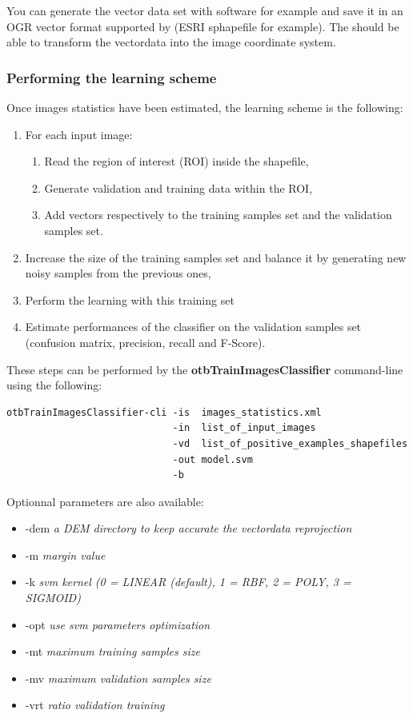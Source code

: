 You can generate the vector data set with \qgis software for
example and save it in an OGR vector format supported by \gdal (ESRI
sphapefile for example). The \app should be able to transform the
vectordata into the image coordinate system.

\subsubsection{Performing the learning scheme}

Once images statistics have been estimated, the learning scheme is the following:
\begin{enumerate}
  \item For each input image:
  \begin{enumerate}
    \item Read the region of interest (ROI) inside the shapefile,
    \item Generate validation and training data within the ROI,
    \item Add vectors respectively to the training samples set and the validation samples set.
  \end{enumerate}
  \item Increase the size of the training samples set and balance it by generating new noisy samples from the previous ones,
  \item Perform the learning with this training set
  \item Estimate performances of the classifier on the validation samples set (confusion matrix, precision, recall and F-Score).
\end{enumerate}

These steps can be performed by the \textbf{otbTrainImagesClassifier} command-line using the following:

\begin{verbatim}
otbTrainImagesClassifier-cli -is  images_statistics.xml 
                             -in  list_of_input_images 
                             -vd  list_of_positive_examples_shapefiles
                             -out model.svm
                             -b
\end{verbatim}

Optionnal parameters are also available:
\begin{itemize}
\item -dem \textit{a DEM directory to keep accurate the vectordata reprojection}
\item -m   \textit{margin value}
\item -k   \textit{svm kernel (0 = LINEAR (default), 1 = RBF,  2 = POLY, 3 = SIGMOID) }
\item -opt \textit{use svm parameters optimization}
\item -mt  \textit{maximum training samples size} 
\item -mv  \textit{maximum validation samples size}
\item -vrt \textit{ratio validation training}
\end{itemize}

